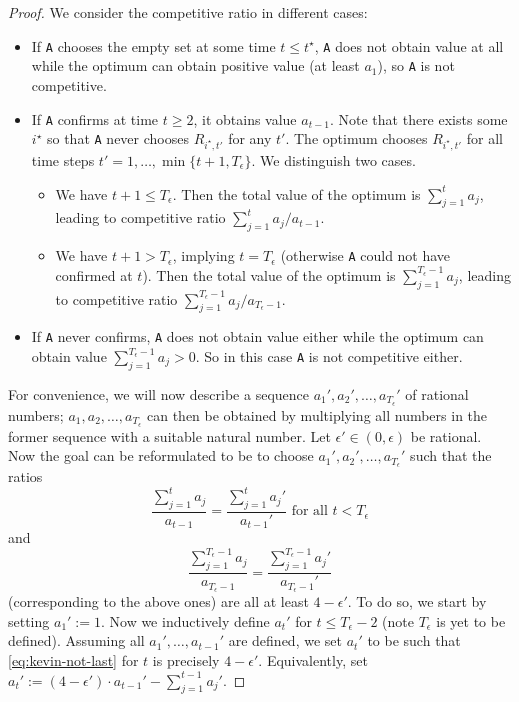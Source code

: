 \documentclass[a4paper]{book}
\newtheorem{proof}{\noindent{\bf Proof.} }
\begin{document}
\begin{proof}
We consider the competitive ratio in different cases:
\begin{itemize}
    \item If \texttt{A} chooses the empty set at some time $t\leq t^\star$, \texttt{A} does not obtain value at all while the optimum can obtain positive value (at least $a_1$), so \texttt{A} is not competitive.
    \item If \texttt{A} confirms at time $t\geq 2$, it obtains value $a_{t-1}$. Note that there exists some $i^\star$ so that \texttt{A} never chooses $R_{i^\star,t'}$ for any $t'$. The optimum chooses $R_{i^\star,t'}$ for all time steps $t'=1,\dots,\min\{t+1,T_\epsilon\}$. We distinguish two cases.
    \begin{itemize}
        \item We have $t+1\leq T_\epsilon$. Then the total value of the optimum is $\sum_{j=1}^{t}a_j$, leading to competitive ratio $\sum_{j=1}^{t}a_j/a_{t-1}$.
        \item We have $t+1>T_\epsilon$, implying $t=T_\epsilon$ (otherwise \texttt{A} could not have confirmed at $t$). Then the total value of the optimum is $\sum_{j=1}^{T_\epsilon-1}a_j$, leading to competitive ratio $\sum_{j=1}^{T_\epsilon-1}a_j/a_{T_\epsilon-1}$.
    \end{itemize}
    \item If \texttt{A} never confirms, \texttt{A} does not obtain value either while the optimum can obtain value $\sum_{j=1}^{T_\epsilon-1}a_j>0$. So in this case \texttt{A} is not competitive either.
\end{itemize}

For convenience, we will now describe a sequence $a_1',a_2',\dots,a_{T_\epsilon}'$ of rational numbers; $a_1,a_2,\dots,a_{T_\epsilon}$ can then be obtained by multiplying all numbers in the former sequence with a suitable natural number. Let $\epsilon'\in(0,\epsilon)$ be rational. Now the goal can be reformulated to be to choose $a_1',a_2',\dots,a_{T_\epsilon}'$ such that the ratios 
\begin{equation}\label{eq:kevin-not-last}
    \frac{\sum_{j=1}^{t}a_j}{a_{t-1}}=\frac{\sum_{j=1}^{t}a_j'}{a_{t-1}'}\text{ for all }t<T_\epsilon
\end{equation} and
\begin{equation}\label{eq:kevin-last}
    \frac{\sum_{j=1}^{T_\epsilon-1}a_j}{a_{T_\epsilon-1}}=\frac{\sum_{j=1}^{T_\epsilon-1}a_j'}{a_{T_\epsilon-1}'}
\end{equation} (corresponding to the above ones) are all at least $4-\epsilon'$. To do so, we start by setting $a_1':=1$. Now we inductively define $a_t'$ for $t\leq T_\epsilon-2$ (note $T_\epsilon$ is yet to be defined). Assuming all $a_1',\dots,a_{t-1}'$ are defined, we set $a_t'$ to be such that \eqref{eq:kevin-not-last} for $t$ is precisely $4-\epsilon'$. Equivalently, set $a_t':=(4-\epsilon')\cdot a_{t-1}'-\sum_{j=1}^{t-1} a_j'$.


\end{proof}
\end{document}
